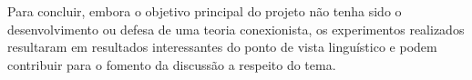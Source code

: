 Para concluir, embora o objetivo principal do projeto não tenha sido o desenvolvimento ou defesa de uma teoria conexionista, os experimentos realizados resultaram em resultados interessantes do ponto de vista linguístico e podem contribuir para o fomento da discussão a respeito do tema.









